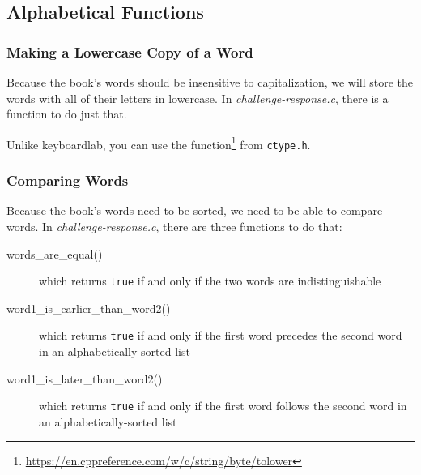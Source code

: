 \subsection{Alphabetical Functions}

\subsubsection{Making a Lowercase Copy of a Word}

Because the book's words should be insensitive to capitalization, we will store the words with all of their letters in lowercase.
In \textit{challenge-response.c}, there is a  function to do just that.

\begin{description}
\end{description}

Unlike keyboardlab, you can use the  function\footnote{\url{https://en.cppreference.com/w/c/string/byte/tolower}} from \texttt{ctype.h}.

\subsubsection{Comparing Words}

Because the book's words need to be sorted, we need to be able to compare words.
In \textit{challenge-response.c}, there are three functions to do that:
\begin{description}
    \item[words\_are\_equal()] which returns \lstinline{true} if and only if the two words are indistinguishable
    \item[word1\_is\_earlier\_than\_word2()] which returns \lstinline{true} if and only if the first word precedes the second word in an alphabetically-sorted list
    \item[word1\_is\_later\_than\_word2()] which returns \lstinline{true} if and only if the first word follows the second word in an alphabetically-sorted list
\end{description}

\begin{description}
\end{description}


